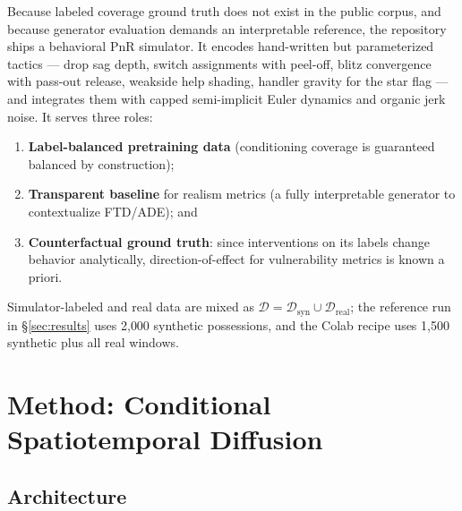 \documentclass[11pt]{article}
\begin{document}
Because labeled coverage ground truth does not exist in the public corpus,
and because generator evaluation demands an interpretable reference, the
repository ships a behavioral PnR simulator. It encodes hand-written but
parameterized tactics --- drop sag depth, switch assignments with peel-off,
blitz convergence with pass-out release, weakside help shading, handler
gravity for the star flag --- and integrates them with capped semi-implicit
Euler dynamics and organic jerk noise. It serves three roles:
\begin{enumerate}[leftmargin=*,itemsep=1pt]
\item \textbf{Label-balanced pretraining data} (conditioning coverage is
  guaranteed balanced by construction);
\item \textbf{Transparent baseline} for realism metrics (a fully
  interpretable generator to contextualize FTD/ADE); and
\item \textbf{Counterfactual ground truth}: since interventions on its labels
  change behavior analytically, direction-of-effect for vulnerability
  metrics is known a priori.
\end{enumerate}
Simulator-labeled and real data are mixed as
$\mathcal{D} = \mathcal{D}_{\text{syn}} \cup \mathcal{D}_{\text{real}}$;
the reference run in \S\ref{sec:results} uses 2{,}000 synthetic possessions,
and the Colab recipe uses 1{,}500 synthetic plus all real windows.

\section{Method: Conditional Spatiotemporal Diffusion}
\label{sec:method}

\subsection{Architecture}
\label{sec:arch}
\end{document}
